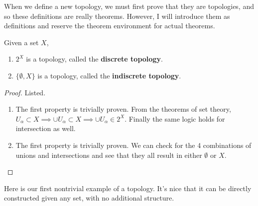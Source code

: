   When we define a new topology, we must first prove that they are topologies, and so these definitions are really theorems. However, I will introduce them as definitions and reserve the theorem environment for actual theorems. 

  \begin{definition}
    \label{def:discrete-indiscrete-topologies}
    Given a set $X$, 
    \begin{enumerate}
      \item $2^X$ is a topology, called the \textbf{discrete topology}. 
      \item $\{\emptyset, X \}$ is a topology, called the \textbf{indiscrete topology}. 
    \end{enumerate}
  \end{definition}
  \begin{proof}
    Listed. 
    \begin{enumerate}
      \item The first property is trivially proven. From the theorems of set theory, $U_\alpha \subset X \implies \cup U_\alpha \subset X \implies \cup U_\alpha \in 2^X$. Finally the same logic holds for intersection as well. 
      \item The first property is trivially proven. We can check for the 4 combinations of unions and intersections and see that they all result in either $\emptyset$ or $X$. 
    \end{enumerate}
  \end{proof}

  Here is our first nontrivial example of a topology. It's nice that it can be directly constructed given any set, with no additional structure. 

